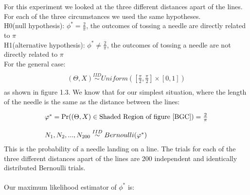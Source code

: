 For this experiment we looked at the three different distances apart of the lines. For each of the three circumstances we used the same hypotheses.\\
H0(null hypothesis): $\phi^*=\frac{2}{\pi}$, the outcomes of tossing a needle are directly related to $\pi$\\
H1(alternative hypothesis): $\phi^*\neq\frac{2}{\pi}$, the outcomes of tossing a needle are not directly related to $\pi$\\
For the general case:
\begin{displaymath}
\begin{array}{l}
\\(\Theta,X)\overset{IID}{\sim} Uniform([\frac{\pi}{2},\frac{\pi}{2}] \times [0,1])\\
\end{array}
\end{displaymath}
as shown in figure 1.3. We know that for our simplest situation, where the length of the needle is the same as the distance between the lines:

\begin{displaymath}
\begin{array}{l}
\phi^*=\Pr((\Theta,X)\in \text{Shaded Region of figure~\ref{BGC}})=\frac{2}{\pi}\\
\\N_1,N_2,...,N_{200} \overset{IID}{\sim} Bernoulli(\phi^*)\\
\end{array}
\end{displaymath}
This is the probability of a needle landing on a line. The trials for each of the three different distances apart of the lines are 200 independent and identically distributed Bernoulli trials.
\\
\\
\noindent
Our maximum likelihood estimator of $\phi^*$ is:

